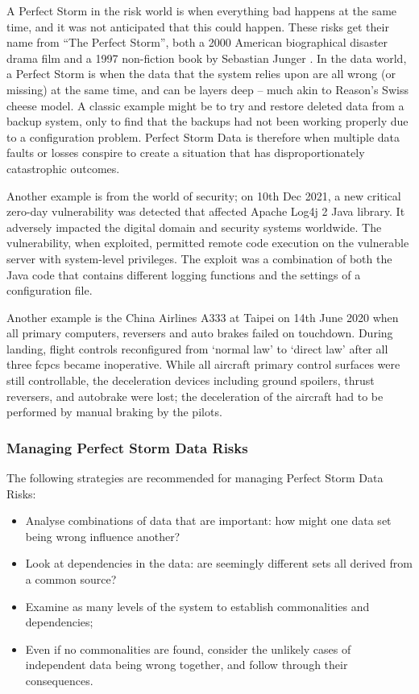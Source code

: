 A Perfect Storm in the risk world is when everything bad happens at the same time,
and it was not anticipated that this could happen.
These risks get their name from “The Perfect Storm”,
both a 2000 American biographical disaster drama film \cite{citation:perfectstorm:website}
and a 1997 non-fiction book by Sebastian Junger \cite{citation:perfectstorm:book}.
In the data world, a Perfect Storm is when the data that the system relies upon are all wrong
(or missing) at the same time, and can be layers deep – much akin to Reason’s Swiss cheese model.
A classic example might be to try and restore deleted data from a backup system,
only to find that the backups had not been working properly due to a configuration problem.
Perfect Storm Data is therefore when multiple data faults or losses conspire to create a
situation that has disproportionately catastrophic outcomes.

Another example is from the world of security;
on 10th Dec 2021, a new critical zero-day vulnerability was detected that affected
Apache Log4j 2 Java library.
It adversely impacted the digital domain and security systems worldwide.
The vulnerability, when exploited, permitted remote code execution on the vulnerable server
with system-level privileges.
The exploit was a combination of both the Java code that contains different logging functions
and the settings of a configuration file.

Another example is the China Airlines A333 at Taipei on 14th June 2020  when all primary computers,
reversers and auto brakes failed on touchdown.
During landing, flight controls reconfigured from ‘normal law’ to ‘direct law’ after all three
\glspl{fcpc} became inoperative.
While all aircraft primary control surfaces were still controllable,
the deceleration devices including ground spoilers, thrust reversers, and autobrake were lost;
the deceleration of the aircraft had to be performed by manual braking by the pilots.

\subsubsection{Managing Perfect Storm Data Risks}
The following strategies are recommended for managing Perfect Storm Data Risks:
\begin{itemize}
\item Analyse combinations of data that are important: how might one data set being wrong influence another?
\item Look at dependencies in the data: are seemingly different sets all derived from a common source?
\item Examine as many levels of the system to establish commonalities and dependencies;
\item Even if no commonalities are found,
consider the unlikely cases of independent data being wrong together,
and follow through their consequences.
\end{itemize}

